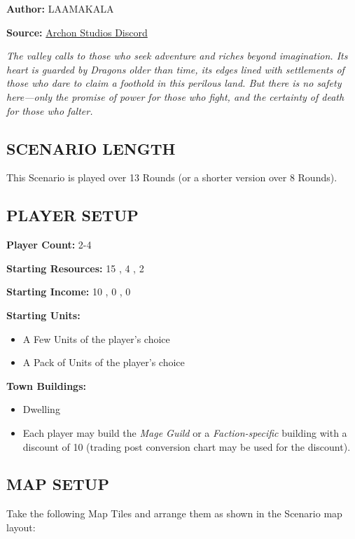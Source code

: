 
\begin{multicols*}{2}

\textbf{Author:} LAAMAKALA

\textbf{Source:} \href{https://discord.com/channels/740870068178649108/1239631918643941509}{Archon Studios Discord}

\textit{The valley calls to those who seek adventure and riches beyond imagination. Its heart is guarded by Dragons older than time, its edges lined with settlements of those who dare to claim a foothold in this perilous land. But there is no safety here—only the promise of power for those who fight, and the certainty of death for those who falter.}

\subsection*{\MakeUppercase{Scenario Length}}
This Scenario is played over 13 Rounds (or a shorter version over 8 Rounds).

\subsection*{\MakeUppercase{Player Setup}}
\textbf{Player Count:} 2-4

\textbf{Starting Resources:} 15 , 4 , 2 

\textbf{Starting Income:} 10 , 0 , 0 

\textbf{Starting Units:}
\begin{itemize}
  \item A Few  Units of the player's choice
  \item A Pack of  Units of the player's choice
\end{itemize}

\textbf{Town Buildings:} 
\begin{itemize}
  \item {} Dwelling
  \item Each player may build the \textit{Mage Guild} or a \textit{Faction-specific} building with a discount of 10  (trading post conversion chart may be used for the discount).
\end{itemize}

\subsection*{\MakeUppercase{Map Setup}}
Take the following Map Tiles and arrange them as shown in the Scenario map layout:


\end{multicols*}
